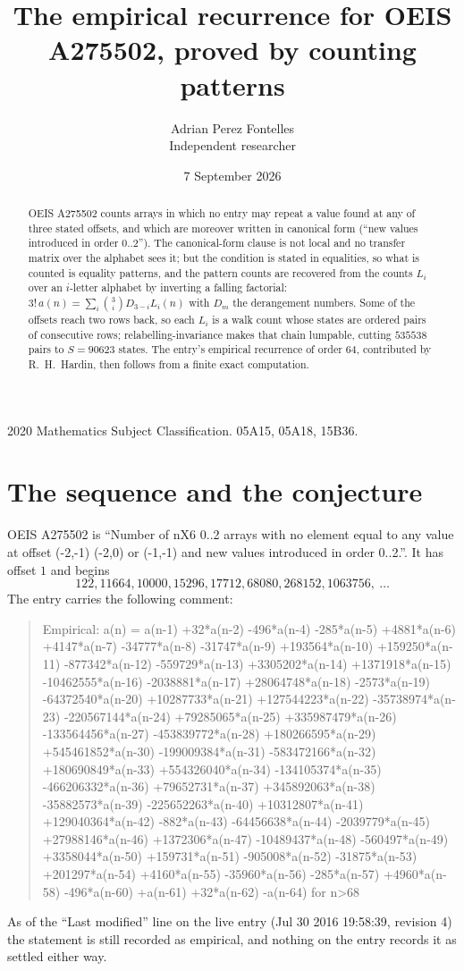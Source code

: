 \documentclass[11pt,a4paper]{article}
\title{The empirical recurrence for OEIS A275502, proved by counting patterns}
\author{Adrian Perez Fontelles\\ \small Independent researcher}
\date{7 September 2026}
\theoremstyle{plain}
\theoremstyle{definition}
\begin{document}
\maketitle

\begin{abstract}
OEIS A275502 counts arrays in which no entry may repeat a value found at any of three stated
offsets, and which are moreover written in canonical form (``new values introduced in order
$0..2$''). The canonical-form clause is not local and no transfer matrix over the
alphabet sees it; but the condition is stated in equalities, so what is counted is equality
patterns, and the pattern counts are recovered from the counts $L_i$ over an $i$-letter
alphabet by inverting a falling factorial:
$3!\,a(n)=\sum_i\binom{3}{i}D_{3-i}L_i(n)$ with $D_m$ the derangement numbers.
Some of the offsets reach two rows back, so each $L_i$ is a walk count whose states are
ordered pairs of consecutive rows; relabelling-invariance makes that chain lumpable,
cutting $535538$ pairs to $S=90623$ states. The entry's empirical recurrence of order $64$,
contributed by R.~H.~Hardin, then follows from a finite exact computation.
\end{abstract}

\noindent\small 2020 Mathematics Subject Classification. 05A15, 05A18, 15B36.\normalsize

\section{The sequence and the conjecture}

OEIS A275502 is ``Number of nX6 0..2 arrays with no element equal to any value at offset (-2,-1) (-2,0) or (-1,-1) and new values introduced in order 0..2.''. It has offset $1$ and begins
\[
122, 11664, 10000, 15296, 17712, 68080, 268152, 1063756,\ \dots
\]
The entry carries the following comment:
\begin{quote}\small
Empirical: a(n) = a(n-1) +32*a(n-2) -496*a(n-4) -285*a(n-5) +4881*a(n-6) +4147*a(n-7) -34777*a(n-8) -31747*a(n-9) +193564*a(n-10) +159250*a(n-11) -877342*a(n-12) -559729*a(n-13) +3305202*a(n-14) +1371918*a(n-15) -10462555*a(n-16) -2038881*a(n-17) +28064748*a(n-18) -2573*a(n-19) -64372540*a(n-20) +10287733*a(n-21) +127544223*a(n-22) -35738974*a(n-23) -220567144*a(n-24) +79285065*a(n-25) +335987479*a(n-26) -133564456*a(n-27) -453839772*a(n-28) +180266595*a(n-29) +545461852*a(n-30) -199009384*a(n-31) -583472166*a(n-32) +180690849*a(n-33) +554326040*a(n-34) -134105374*a(n-35) -466206332*a(n-36) +79652731*a(n-37) +345892063*a(n-38) -35882573*a(n-39) -225652263*a(n-40) +10312807*a(n-41) +129040364*a(n-42) -882*a(n-43) -64456638*a(n-44) -2039779*a(n-45) +27988146*a(n-46) +1372306*a(n-47) -10489437*a(n-48) -560497*a(n-49) +3358044*a(n-50) +159731*a(n-51) -905008*a(n-52) -31875*a(n-53) +201297*a(n-54) +4160*a(n-55) -35960*a(n-56) -285*a(n-57) +4960*a(n-58) -496*a(n-60) +a(n-61) +32*a(n-62) -a(n-64) for n>68
\end{quote}
As of the ``Last modified'' line on the live entry (Jul 30 2016 19:58:39, revision 4) the statement is
still recorded as empirical, and nothing on the entry records it as settled either way.
\end{document}
